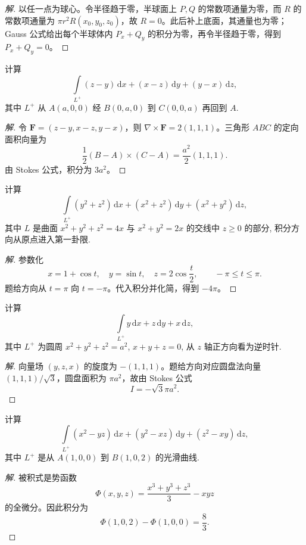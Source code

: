 \documentclass[../../数学分析培优讲义(答案版).tex]{subfiles}
\begin{document}
\begin{proof}[解]
以任一点为球心。令半径趋于零，半球面上 $P,Q$ 的常数项通量为零，而 $R$ 的常数项通量为 $\pi r^2R(x_0,y_0,z_0)$，故 $R=0$。此后补上底面，其通量也为零；Gauss 公式给出每个半球体内 $P_x+Q_y$ 的积分为零，再令半径趋于零，得到 $P_x+Q_y=0$。
\end{proof}

\begin{example}
计算
\[
    \int\limits_{L^+}(z-y)\,\mathrm{d}x+(x-z)\,\mathrm{d}y+(y-x)\,\mathrm{d}z,
\]
其中 $L^+$ 从 $A(a,0,0)$ 经 $B(0,a,0)$ 到 $C(0,0,a)$ 再回到 $A$.
\end{example}

\begin{proof}[解]
令 $\bm F=(z-y,x-z,y-x)$，则 $\nabla\times\bm F=2(1,1,1)$。三角形 $ABC$ 的定向面积向量为
\[
\dfrac{1}{2}(B-A)\times(C-A)=\dfrac{a^2}{2}(1,1,1).
\]
由 Stokes 公式，积分为 $3a^2$。
\end{proof}

\begin{example}
计算
\[
    \int\limits_{L^+}(y^2+z^2)\,\mathrm{d}x+(x^2+z^2)\,\mathrm{d}y+(x^2+y^2)\,\mathrm{d}z,
\]
其中 $L$ 是曲面 $x^2+y^2+z^2=4x$ 与 $x^2+y^2=2x$ 的交线中 $z\geq0$ 的部分, 积分方向从原点进入第一卦限.
\end{example}

\begin{proof}[解]
参数化
\[
x=1+\cos t,\quad y=\sin t,\quad z=2\cos\dfrac{t}{2},\qquad -\pi\leq t\leq\pi.
\]
题给方向从 $t=\pi$ 向 $t=-\pi$。代入积分并化简，得到 $-4\pi$。
\end{proof}

\begin{example}
计算
\[
    \int\limits_{L^+}y\,\mathrm{d}x+z\,\mathrm{d}y+x\,\mathrm{d}z,
\]
其中 $L^+$ 为圆周 $x^2+y^2+z^2=a^2$, $x+y+z=0$, 从 $z$ 轴正方向看为逆时针.
\end{example}

\begin{proof}[解]
向量场 $(y,z,x)$ 的旋度为 $-(1,1,1)$。题给方向对应圆盘法向量 $(1,1,1)/\sqrt{3}$，圆盘面积为 $\pi a^2$，故由 Stokes 公式
\[
I=-\sqrt{3}\pi a^2.
\]
\end{proof}

\begin{example}
计算
\[
    \int\limits_{L^+}(x^2-yz)\,\mathrm{d}x+(y^2-xz)\,\mathrm{d}y+(z^2-xy)\,\mathrm{d}z,
\]
其中 $L^+$ 是从 $A(1,0,0)$ 到 $B(1,0,2)$ 的光滑曲线.
\end{example}

\begin{proof}[解]
被积式是势函数
\[
\Phi(x,y,z)=\dfrac{x^3+y^3+z^3}{3}-xyz
\]
的全微分。因此积分为
\[
\Phi(1,0,2)-\Phi(1,0,0)=\dfrac{8}{3}.
\]
\end{proof}
\end{document}
